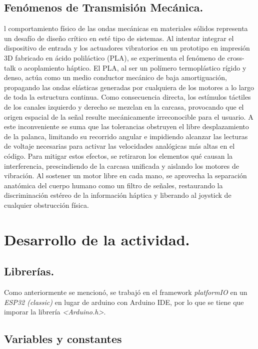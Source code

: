 \documentclass[conference]{IEEEtran}
\begin{document}
  \subsection{Fenómenos de Transmisión Mecánica.}
  l comportamiento físico de las ondas mecánicas en materiales sólidos representa un desafío de diseño crítico en esté tipo de sistemas. Al intentar integrar el dispositivo de entrada y los actuadores vibratorios en un prototipo en impresión 3D fabricado en ácido poliláctico (PLA), se experimenta el fenómeno de cross-talk o acoplamiento háptico. El PLA, al ser un polímero termoplástico rígido y denso, actúa como un medio conductor mecánico de baja amortiguación, propagando las ondas elásticas generadas por cualquiera de los motores a lo largo de toda la estructura continua. Como consecuencia directa, los estímulos táctiles de los canales izquierdo y derecho se mezclan en la carcasa, provocando que el origen espacial de la señal resulte mecánicamente irreconocible para el usuario.
A este inconveniente se suma que las tolerancias obstruyen el libre desplazamiento de la palanca, limitando su recorrido angular e impidiendo alcanzar las lecturas de voltaje necesarias para activar las velocidades analógicas más altas en el código. Para mitigar estos efectos, se retiraron los elementos qué causan la interferencia, prescindiendo de la carcasa unificada y aislando los motores de vibración. Al sostener un motor libre en cada mano, se aprovecha la separación anatómica del cuerpo humano como un filtro de señales, restaurando la discriminación estéreo de la información háptica y liberando al joystick de cualquier obstrucción física.


\section{Desarrollo de la actividad.}
  \subsection{Librerías.}
  Como anteriormente se mencionó, se trabajó en el framework \textit{platformIO} en un \textit{ESP32 (classic)} en lugar de arduino con Arduino IDE, por lo que se tiene que imporar la librería \textit{<Arduino.h>}.
  
  \subsection{Variables y constantes}
\end{document}

